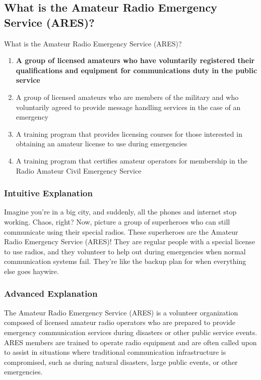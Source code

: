\subsection{What is the Amateur Radio Emergency Service (ARES)?}
\label{T2C06}

\begin{tcolorbox}[colback=gray!10!white,colframe=black!75!black,title=T2C06]
What is the Amateur Radio Emergency Service (ARES)?
\begin{enumerate}[label=\Alph*)]
    \item \textbf{A group of licensed amateurs who have voluntarily registered their qualifications and equipment for communications duty in the public service}
    \item A group of licensed amateurs who are members of the military and who voluntarily agreed to provide message handling services in the case of an emergency
    \item A training program that provides licensing courses for those interested in obtaining an amateur license to use during emergencies
    \item A training program that certifies amateur operators for membership in the Radio Amateur Civil Emergency Service
\end{enumerate}
\end{tcolorbox}

\subsubsection{Intuitive Explanation}
Imagine you're in a big city, and suddenly, all the phones and internet stop working. Chaos, right? Now, picture a group of superheroes who can still communicate using their special radios. These superheroes are the Amateur Radio Emergency Service (ARES)! They are regular people with a special license to use radios, and they volunteer to help out during emergencies when normal communication systems fail. They’re like the backup plan for when everything else goes haywire.

\subsubsection{Advanced Explanation}
The Amateur Radio Emergency Service (ARES) is a volunteer organization composed of licensed amateur radio operators who are prepared to provide emergency communication services during disasters or other public service events. ARES members are trained to operate radio equipment and are often called upon to assist in situations where traditional communication infrastructure is compromised, such as during natural disasters, large public events, or other emergencies.

